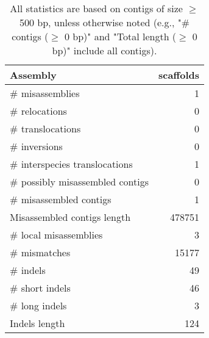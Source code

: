 \documentclass[12pt,a4paper]{article}
\begin{document}
\begin{table}[ht]
\begin{center}
\caption{All statistics are based on contigs of size $\geq$ 500 bp, unless otherwise noted (e.g., "\# contigs ($\geq$ 0 bp)" and "Total length ($\geq$ 0 bp)" include all contigs).}
\begin{tabular}{|l*{1}{|r}|}
\hline
Assembly & scaffolds \\ \hline
\# misassemblies & 1 \\ \hline
\hspace{5mm}\# relocations & 0 \\ \hline
\hspace{5mm}\# translocations & 0 \\ \hline
\hspace{5mm}\# inversions & 0 \\ \hline
\hspace{5mm}\# interspecies translocations & 1 \\ \hline
\# possibly misassembled contigs & 0 \\ \hline
\# misassembled contigs & 1 \\ \hline
Misassembled contigs length & 478751 \\ \hline
\# local misassemblies & 3 \\ \hline
\# mismatches & 15177 \\ \hline
\# indels & 49 \\ \hline
\hspace{5mm}\# short indels & 46 \\ \hline
\hspace{5mm}\# long indels & 3 \\ \hline
Indels length & 124 \\ \hline
\end{tabular}
\end{center}
\end{table}
\end{document}
